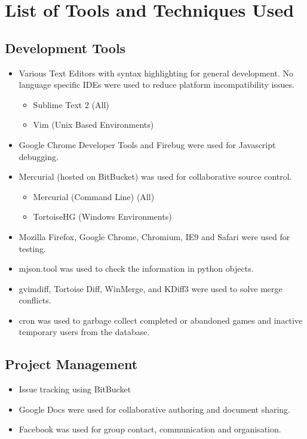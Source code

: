 \section{List of Tools and Techniques Used}
\subsection{Development Tools}
\begin{itemize}
	\setlength{\itemsep}{1pt}
  	\setlength{\parskip}{0pt}
  	\setlength{\parsep}{0pt}
	\item Various Text Editors with syntax highlighting for general development. No language specific IDEs were used to reduce platform incompatibility issues.
	\begin{itemize}
		\setlength{\itemsep}{1pt}
  		\setlength{\parskip}{0pt}
  		\setlength{\parsep}{0pt}
		\item {Sublime Text 2 (All)}
		\item {Vim (Unix Based Environments)}
	\end{itemize}
	\item Google Chrome Developer Tools and Firebug were used for Javascript debugging.
	\item Mercurial (hosted on BitBucket) was used for collaborative source control.
	\begin{itemize}
		\setlength{\itemsep}{1pt}
  		\setlength{\parskip}{0pt}
  		\setlength{\parsep}{0pt}
		\item {Mercurial (Command Line) (All)}
		\item {TortoiseHG (Windows Environments)}
	\end{itemize}
	\item Mozilla Firefox, Google Chrome, Chromium, IE9 and Safari were used for testing.
	\item mjson.tool was used to check the information in python objects.
	\item gvimdiff, Tortoise Diff, WinMerge, and KDiff3 were used to solve merge conflicts.
	\item cron was used to garbage collect completed or abandoned games and inactive temporary users from the database.
\end{itemize}
	
\subsection{Project Management}
\begin{itemize}
	\item Issue tracking using BitBucket
	\item Google Docs were used for collaborative authoring and document sharing.
	\item Facebook was used for group contact, communication and organisation.
\end{itemize}

